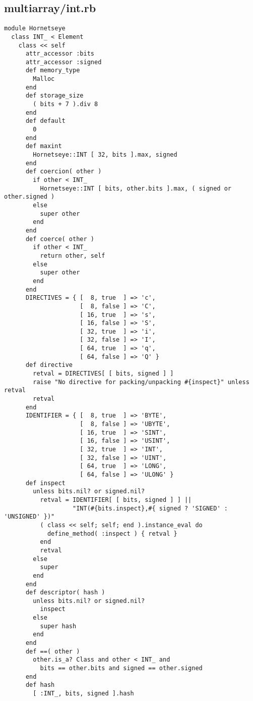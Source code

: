 \subsection{multiarray/int.rb}\label{cha:multiarray-int-rb}
\begin{lstlisting}
module Hornetseye
  class INT_ < Element
    class << self
      attr_accessor :bits
      attr_accessor :signed
      def memory_type
        Malloc
      end
      def storage_size
        ( bits + 7 ).div 8
      end
      def default
        0
      end
      def maxint
        Hornetseye::INT [ 32, bits ].max, signed
      end
      def coercion( other )
        if other < INT_
          Hornetseye::INT [ bits, other.bits ].max, ( signed or other.signed )
        else
          super other
        end
      end
      def coerce( other )
        if other < INT_
          return other, self
        else
          super other
        end
      end
      DIRECTIVES = { [  8, true  ] => 'c',
                     [  8, false ] => 'C',
                     [ 16, true  ] => 's',
                     [ 16, false ] => 'S',
                     [ 32, true  ] => 'i',
                     [ 32, false ] => 'I',
                     [ 64, true  ] => 'q',
                     [ 64, false ] => 'Q' }
      def directive
        retval = DIRECTIVES[ [ bits, signed ] ]
        raise "No directive for packing/unpacking #{inspect}" unless retval
        retval
      end
      IDENTIFIER = { [  8, true  ] => 'BYTE',
                     [  8, false ] => 'UBYTE',
                     [ 16, true  ] => 'SINT',
                     [ 16, false ] => 'USINT',
                     [ 32, true  ] => 'INT',
                     [ 32, false ] => 'UINT',
                     [ 64, true  ] => 'LONG',
                     [ 64, false ] => 'ULONG' }
      def inspect
        unless bits.nil? or signed.nil?
          retval = IDENTIFIER[ [ bits, signed ] ] ||
                   "INT(#{bits.inspect},#{ signed ? 'SIGNED' : 'UNSIGNED' })"
          ( class << self; self; end ).instance_eval do
            define_method( :inspect ) { retval }
          end
          retval
        else
          super
        end
      end
      def descriptor( hash )
        unless bits.nil? or signed.nil?
          inspect
        else
          super hash
        end
      end
      def ==( other )
        other.is_a? Class and other < INT_ and
          bits == other.bits and signed == other.signed
      end
      def hash
        [ :INT_, bits, signed ].hash

\end{lstlisting}
